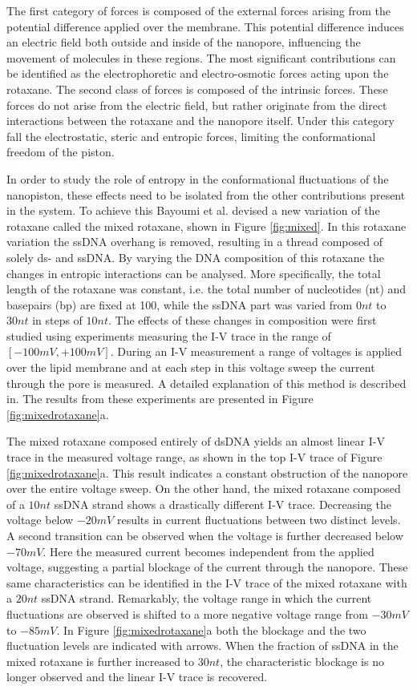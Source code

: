 The first category of forces is composed of the external forces arising from the
potential difference applied over the membrane. This potential difference induces an
electric field both outside and inside of the nanopore, influencing the movement of
molecules in these regions. The most significant contributions can be identified as the
electrophoretic and electro-osmotic forces acting upon the rotaxane. The second class of
forces is composed of the intrinsic forces. These forces do not arise from the
electric field, but rather originate from the direct interactions between the rotaxane
and the nanopore itself. Under this category fall the electrostatic, steric and entropic
forces, limiting the conformational freedom of the piston.

In order to study the role of entropy in the conformational fluctuations of
the nanopiston, these effects need to be isolated from the other contributions present in
the system. To achieve this Bayoumi et al. devised a new variation of the rotaxane
called the mixed rotaxane, shown in Figure \ref{fig:mixed}. In this rotaxane variation
the ssDNA overhang is removed, resulting
in a thread composed of solely ds- and ssDNA. By varying the DNA composition of this
rotaxane the changes in entropic interactions can be analysed. More specifically, the
total length of the rotaxane was constant, i.e. the total number of nucleotides (nt) and
basepairs (bp) are fixed at 100, while the ssDNA part was varied from $0nt$ to $30 nt$ in
steps of $10nt$. The effects of these changes in composition were first studied using
experiments measuring the I-V
trace in the range of $[-100mV, +100mV]$. During an I-V measurement a range of
voltages is applied over the lipid membrane and at each step in this voltage sweep the
current through the pore is measured. A detailed explanation of this method is described
in.\cite{MAGLIA2010591} The results from these experiments are presented in Figure
\ref{fig:mixedrotaxane}a.

The mixed rotaxane composed entirely of dsDNA yields an almost linear I-V trace in the
measured voltage range, as shown in the top I-V trace of Figure \ref{fig:mixedrotaxane}a.
This result indicates a constant obstruction of the nanopore over
the entire voltage sweep. On the other hand, the mixed rotaxane composed of a $10nt$
ssDNA strand shows a drastically different I-V trace. Decreasing the voltage below
$-20mV$ results in current fluctuations between two distinct levels. A second transition
can be observed when the voltage is further decreased below $-70mV$. Here the measured
current becomes independent from the applied voltage, suggesting a partial blockage of
the current through the nanopore. These same characteristics can be identified in the I-V
trace of the mixed rotaxane with a $20nt$ ssDNA strand. Remarkably, the voltage range
in which the current fluctuations are observed is shifted to a more negative
voltage range from $-30mV$ to  $-85 mV$. In Figure \ref{fig:mixedrotaxane}a both the
blockage and the two fluctuation levels are indicated with arrows. When the fraction of
ssDNA in the mixed rotaxane is further increased to $30nt$, the characteristic blockage
is no longer observed and the linear I-V trace is recovered.

